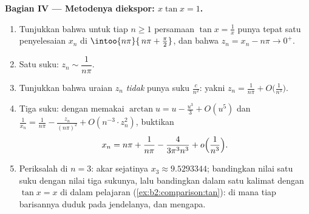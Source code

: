 \begin{problem}
\medskip
\noindent\textbf{Bagian IV --- Metodenya diekspor: $x\tan x =
1$.}
\begin{enumerate}[resume]
  \item Tunjukkan bahwa untuk tiap $n \geq 1$ persamaan $\tan x =
        \frac1x$ punya tepat satu penyelesaian $x_n$ di
        $\intoo{n\pi}{\,n\pi + \frac\pi2}$, dan bahwa $z_n = x_n
        - n\pi \to 0^+$.
  \item Satu suku: $z_n \sim \dfrac{1}{n\pi}$.
  \item Tunjukkan bahwa uraian $z_n$ \emph{tidak} punya
        suku $\frac{c}{n^2}$: yakni $z_n = \frac1{n\pi} +
        O\bigl(\frac{1}{n^3}\bigr)$.
  \item Tiga suku: dengan memakai $\arctan u = u - \frac{u^3}3 +
        O(u^5)$ dan $\frac1{x_n} = \frac{1}{n\pi} -
        \frac{z_n}{(n\pi)^2} + O(n^{-3}\cdot z_n^2)$, buktikan
        \[
        x_n = n\pi + \frac{1}{n\pi} -
        \frac{4}{3\pi^3 n^3} + o\Bigl(\frac{1}{n^3}\Bigr).
        \]
  \item Periksalah di $n = 3$: akar sejatinya $x_3 \approx 9.5293344$;
        bandingkan nilai satu suku dengan nilai tiga sukunya, lalu
        bandingkan dalam satu kalimat dengan $\tan x = x$ di dalam
        pelajaran (\cref{ex:b2:comparison:tan}): di mana tiap barisannya
        duduk pada jendelanya, dan mengapa.
\end{enumerate}


\end{problem}
